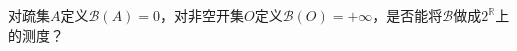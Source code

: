 \documentclass{ctexart}
\newif\ifpreface
\begin{document}
\large
\setlength{\baselineskip}{1.2em}
\ifpreface

\else
\maketitle
\fi
{}
对疏集\(A\)定义\(\mathcal{B}(A)=0\)，对非空开集\(O\)定义\(\mathcal{B}(O)=+ \infty \)，是否能将\(\mathcal{B}\)做成\(2^{\mathbb{R}}\)上的测度？
\end{document}
